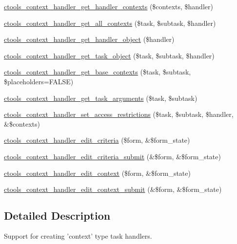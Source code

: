 \begin{DoxyCompactItemize}
\item 
\hyperlink{context-task-handler_8inc_a7d594479dfb21d64f829015a9a58c5bf}{ctools\_\-context\_\-handler\_\-get\_\-handler\_\-contexts} (\$contexts, \$handler)
\item 
\hyperlink{context-task-handler_8inc_af70804eb84ffd6c2b040857ac0afe103}{ctools\_\-context\_\-handler\_\-get\_\-all\_\-contexts} (\$task, \$subtask, \$handler)
\item 
\hyperlink{context-task-handler_8inc_ad6d75da1158b69630c10d3045371accb}{ctools\_\-context\_\-handler\_\-get\_\-handler\_\-object} (\$handler)
\item 
\hyperlink{context-task-handler_8inc_a79cea3fa99256e4d46406e9e581c19f7}{ctools\_\-context\_\-handler\_\-get\_\-task\_\-object} (\$task, \$subtask, \$handler)
\item 
\hyperlink{context-task-handler_8inc_a380211d538fb41398e95489c3cbb71d3}{ctools\_\-context\_\-handler\_\-get\_\-base\_\-contexts} (\$task, \$subtask, \$placeholders=FALSE)
\item 
\hyperlink{context-task-handler_8inc_a4179b2d1d2e10e075410d7697605350d}{ctools\_\-context\_\-handler\_\-get\_\-task\_\-arguments} (\$task, \$subtask)
\item 
\hyperlink{context-task-handler_8inc_ad2948839af1d627eb4b8eade2cce0cd3}{ctools\_\-context\_\-handler\_\-set\_\-access\_\-restrictions} (\$task, \$subtask, \$handler, \&\$contexts)
\item 
\hyperlink{context-task-handler_8inc_a9cad8c277bdc4feec169f3faa96f9a41}{ctools\_\-context\_\-handler\_\-edit\_\-criteria} (\$form, \&\$form\_\-state)
\item 
\hyperlink{context-task-handler_8inc_ad1a52d2b414d864cf1928eb23e5e9f26}{ctools\_\-context\_\-handler\_\-edit\_\-criteria\_\-submit} (\&\$form, \&\$form\_\-state)
\item 
\hyperlink{context-task-handler_8inc_afb5b9d894523e3e5e372405cdb0b4739}{ctools\_\-context\_\-handler\_\-edit\_\-context} (\$form, \&\$form\_\-state)
\item 
\hyperlink{context-task-handler_8inc_aa62251a1beab5f93c4713a72698ce827}{ctools\_\-context\_\-handler\_\-edit\_\-context\_\-submit} (\&\$form, \&\$form\_\-state)
\end{DoxyCompactItemize}


\subsection{Detailed Description}
Support for creating 'context' type task handlers.

